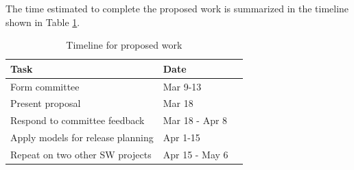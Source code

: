 \documentclass[a4paper]{scrartcl}
\begin{document}
The time estimated to complete the proposed work is summarized in the timeline shown in Table \ref{tab:timeline}.

\begin{table}[h]
\centering
\begin{tabular}{ p{2.5in} l l}
\hline
Task & Date \\
\hline
Form committee & Mar 9-13 \\
Present proposal & Mar 18 \\
Respond to committee feedback & Mar 18 - Apr 8 \\
Apply models for release planning & Apr 1-15 \\
Repeat on two other SW projects & Apr 15 - May 6 \\
\hline
\end{tabular}
\caption{Timeline for proposed work}
\label{tab:timeline}
\end{table}





\end{document}
